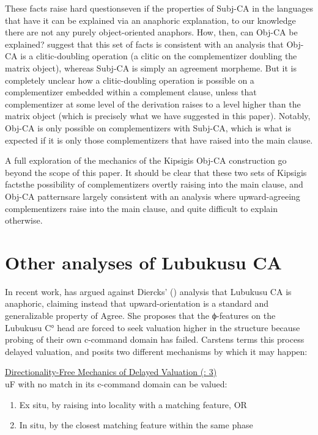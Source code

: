 \documentclass[output=paper
,modfonts
,nonflat
]{langsci/langscibook}
\begin{document}
These facts raise hard questions\textemdash even if the properties of Subj-CA in the languages that have it can be explained via an anaphoric explanation, to our knowledge there are not any purely object-oriented anaphors. How, then, can Obj-CA be explained? \citet{DiercksRao:2017} suggest that this set of facts is consistent with an analysis that Obj-CA is a clitic-doubling operation (a clitic on the complementizer doubling the matrix object), whereas Subj-CA is simply an agreement morpheme. But it is completely unclear how a clitic-doubling operation is possible on a complementizer embedded within a complement clause, unless that complementizer at some level of the derivation raises to a level higher than the matrix object (which is precisely what we have suggested in this paper). Notably, Obj-CA is only possible on complementizers with Subj-CA, which is what is expected if it is only those complementizers that have raised into the main clause.  

A full exploration of the mechanics of the Kipsigis Obj-CA construction go beyond the scope of this paper. It should be clear that these two sets of Kipsigis facts\textemdash the possibility of complementizers overtly raising into the main clause, and Obj-CA patterns\textemdash are largely consistent with an analysis where upward-agreeing complementizers raise into the main clause, and quite difficult to explain otherwise. 

\section{Other analyses of Lubukusu CA }\label{sectioncarstens}

In recent work, \citet{Carstens:2016} has argued against Diercks’ (\citeyear{Diercks:2013}) analysis that Lubukusu CA is anaphoric, claiming instead that upward-orientation is a standard and generalizable property of Agree. She proposes that the ϕ-features on the Lubukusu C° head are forced to seek valuation higher in the structure because probing of their own c-command domain has failed. Carstens terms this process delayed valuation, and posits two different mechanisms by which it may happen:

\ea \underline{Directionality-Free Mechanics of Delayed Valuation (\citealt{Carstens:2016}: 3)}\\
	uF with no match in its c-command domain can be valued: \\
\begin{enumerate}
\item Ex situ, by raising into locality with a matching feature, OR
\item In situ, by the closest matching feature within the same phase
\end{enumerate}
\z
\end{document}

